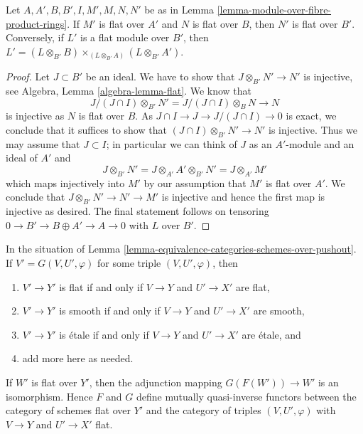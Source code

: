 \begin{lemma}
\label{lemma-flat-module-over-fibre-product-rings}
Let $A, A', B, B', I, M', M, N, N'$ be as in
Lemma \ref{lemma-module-over-fibre-product-rings}.
If $M'$ is flat over $A'$ and $N$ is flat over $B$, then
$N'$ is flat over $B'$.
Conversely, if $L'$ is a flat module over $B'$, then
$L' = (L \otimes_{B'} B) \times_{(L \otimes_{B'} A)} (L \otimes_{B'} A')$.
\end{lemma}

\begin{proof}
Let $J \subset B'$ be an ideal. We have to show that $J \otimes_{B'} N' \to N'$
is injective, see Algebra, Lemma \ref{algebra-lemma-flat}. We know that
$$
J/(J \cap I) \otimes_{B'} N' = J/(J \cap I) \otimes_B N \to N
$$
is injective as $N$ is flat over $B$. As
$J \cap I \to J \to J/(J \cap I) \to 0$ is exact, we
conclude that it suffices to show that $(J \cap I) \otimes_{B'} N' \to N'$
is injective. Thus we may assume that $J \subset I$; in particular we can
think of $J$ as an $A'$-module and an ideal of $A'$ and
$$
J \otimes_{B'} N' = J \otimes_{A'} A' \otimes_{B'} N' =
J \otimes_{A'} M'
$$
which maps injectively into $M'$ by our assumption that $M'$ is flat
over $A'$. We conclude that $J \otimes_{B'} N' \to N' \to M'$ is injective
and hence the first map is injective as desired.
The final statement follows on tensoring
$0 \to B' \to B \oplus A' \to A \to 0$ with $L$ over $B'$.
\end{proof}

\begin{lemma}
\label{lemma-equivalence-categories-schemes-over-pushout-flat}
In the situation of
Lemma \ref{lemma-equivalence-categories-schemes-over-pushout}.
If $V' = G(V, U', \varphi)$ for some triple $(V, U', \varphi)$, then
\begin{enumerate}
\item $V' \to Y'$ is flat if and only if $V \to Y$ and $U' \to X'$ are flat,
\item $V' \to Y'$ is smooth if and only if $V \to Y$ and $U' \to X'$ are smooth,
\item $V' \to Y'$ is \'etale if and only if $V \to Y$ and $U' \to X'$
are \'etale, and
\item add more here as needed.
\end{enumerate}
If $W'$ is flat over $Y'$, then the adjunction mapping
$G(F(W')) \to W'$ is an isomorphism. Hence $F$ and $G$ define mutually
quasi-inverse functors between the category of schemes flat over $Y'$
and the category of triples $(V, U', \varphi)$ with $V \to Y$
and $U' \to X'$ flat.
\end{lemma}

